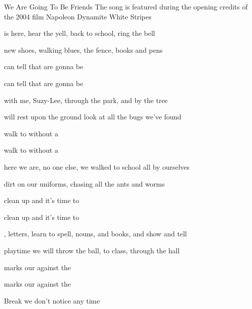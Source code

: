 \begin{SBSong}{We Are Going To Be Friends}
  {The song is featured during the opening credits of the 2004 film Napoleon Dynamite}
  {White Stripes}
  \begin{SBVerse}
     is here, hear the yell, back to school, ring the bell
    
     new shoes, walking blues,  the fence, books and pens
    
     can tell that  are gonna be 
    
     can tell that  are gonna be 
  \end{SBVerse}
  \WBPageBrk
  \begin{SBVerse}
     with me, Suzy-Lee, through the park, and by the tree
    
     will rest upon the ground  look at all the bugs we've found
    
     walk to  without a 
    
     walk to  without a 
  \end{SBVerse}
  \begin{SBVerse}
     here we are, no one else, we walked to school all by ourselves
    
     dirt on our uniforms,  chasing all the ants and worms
    
     clean up and  it's time to 
    
     clean up and  it's time to 
  \end{SBVerse}
  \begin{SBVerse}
    , letters, learn to spell, nouns, and books, and show and tell
    
     playtime we will throw the ball,  to class, through the hall
    
     marks our  against the 
    
     marks our  against the 
  \end{SBVerse}
  \begin{SBBracket}{Break}
     we don't notice any time 
    

\end{SBBracket}
\end{SBSong}
